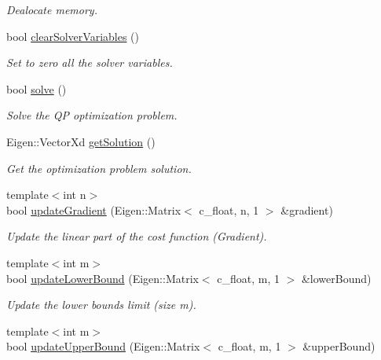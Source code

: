 \begin{DoxyCompactItemize}
\begin{DoxyCompactList}\small\item\em Dealocate memory. \end{DoxyCompactList}\item 
bool \hyperlink{classOSQPWrapper_1_1OptimizerSolver_af1d220b7e0b2154f1f40541ee05f6c0a}{clear\+Solver\+Variables} ()
\begin{DoxyCompactList}\small\item\em Set to zero all the solver variables. \end{DoxyCompactList}\item 
bool \hyperlink{classOSQPWrapper_1_1OptimizerSolver_a00d758275679a54d0ad0be31a8e244b2}{solve} ()
\begin{DoxyCompactList}\small\item\em Solve the QP optimization problem. \end{DoxyCompactList}\item 
Eigen\+::\+Vector\+Xd \hyperlink{classOSQPWrapper_1_1OptimizerSolver_a5427ac88e17f993231400660837c2db1}{get\+Solution} ()
\begin{DoxyCompactList}\small\item\em Get the optimization problem solution. \end{DoxyCompactList}\item 
{\footnotesize template$<$int n$>$ }\\bool \hyperlink{classOSQPWrapper_1_1OptimizerSolver_a075b3b0f98fb9ff5b3924a3b00b58913}{update\+Gradient} (Eigen\+::\+Matrix$<$ c\+\_\+float, n, 1 $>$ \&gradient)
\begin{DoxyCompactList}\small\item\em Update the linear part of the cost function (Gradient). \end{DoxyCompactList}\item 
{\footnotesize template$<$int m$>$ }\\bool \hyperlink{classOSQPWrapper_1_1OptimizerSolver_a414284af643a95340616a1024cd0f2de}{update\+Lower\+Bound} (Eigen\+::\+Matrix$<$ c\+\_\+float, m, 1 $>$ \&lower\+Bound)
\begin{DoxyCompactList}\small\item\em Update the lower bounds limit (size m). \end{DoxyCompactList}\item 
{\footnotesize template$<$int m$>$ }\\bool \hyperlink{classOSQPWrapper_1_1OptimizerSolver_a41d267f5a7c13a7c9caa9b0be4370fcf}{update\+Upper\+Bound} (Eigen\+::\+Matrix$<$ c\+\_\+float, m, 1 $>$ \&upper\+Bound)

\end{DoxyCompactItemize}
